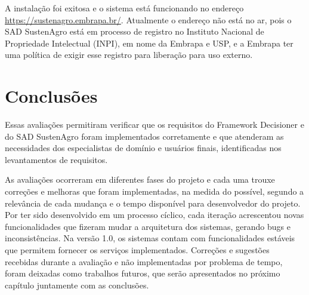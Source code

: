 A instalação foi exitosa e o sistema está funcionando no endereço
\url{https://sustenagro.embrapa.br/}. Atualmente o endereço não está
no ar, pois o SAD SustenAgro está em processo de registro no Instituto
Nacional de Propriedade Intelectual (INPI), em nome da Embrapa e USP,
e a Embrapa ter uma política de exigir esse registro para liberação
para uso externo.

\section{Conclusões}

Essas avaliações permitiram verificar que os requisitos do Framework
Decisioner e do SAD SustenAgro foram implementados corretamente e
que atenderam as necessidades dos especialistas de domínio e usuários
finais, identificadas nos levantamentos de requisitos.

As avaliações ocorreram em diferentes fases do projeto e cada uma
trouxe correções e melhoras que foram implementadas, na medida do
possível, segundo a relevância de cada mudança e o tempo disponível
para desenvolvedor do projeto. Por ter sido desenvolvido em um processo
cíclico, cada iteração acrescentou novas funcionalidades que fizeram
mudar a arquitetura dos sistemas, gerando \foreignlanguage{english}{bugs}
e inconsistências. Na versão 1.0, os sistemas contam com funcionalidades
estáveis que permitem fornecer os serviços implementados. Correções
e sugestões recebidas durante a avaliação e não implementadas por
problema de tempo, foram deixadas como trabalhos futuros, que serão
apresentados no próximo capítulo juntamente com as conclusões.
